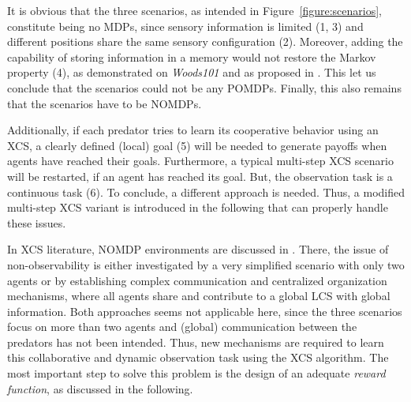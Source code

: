 It is obvious that the three scenarios, as intended in Figure~\ref{figure:scenarios}, constitute being no MDPs, since sensory information is limited (1, 3) and different positions share the same sensory configuration (2). Moreover, adding the capability of storing information in a memory would not restore the Markov property (4), as demonstrated on \emph{Woods101} and as proposed in \cite{Lan98,LW00}. This let us conclude that the scenarios could not be any POMDPs. Finally, this also remains that the scenarios have to be NOMDPs. 

Additionally, if each predator tries to learn its cooperative behavior using an XCS, a clearly defined (local) goal (5) will be needed to generate payoffs when agents have reached their goals. Furthermore, a typical multi-step XCS scenario will be restarted, if an agent has reached its goal. But, the observation task is a continuous task (6). %
To conclude, a different approach is needed. Thus, a modified multi-step XCS variant is introduced in the following that can properly handle these issues.

In XCS literature, NOMDP environments are discussed in \cite{Miyazaki2,TTS01}. There, the issue of non-observability is either investigated by a very simplified scenario with only two agents or by establishing complex communication and centralized organization mechanisms, where all agents share and contribute to a global LCS with global information. Both approaches seems not applicable here, since the three scenarios focus on more than two agents and (global) communication between the predators has not been intended. Thus, new mechanisms are required to learn this %
collaborative and dynamic observation task using the XCS algorithm. The most important step to solve this problem is the design of an adequate \emph{reward function}, as discussed in the following. %
